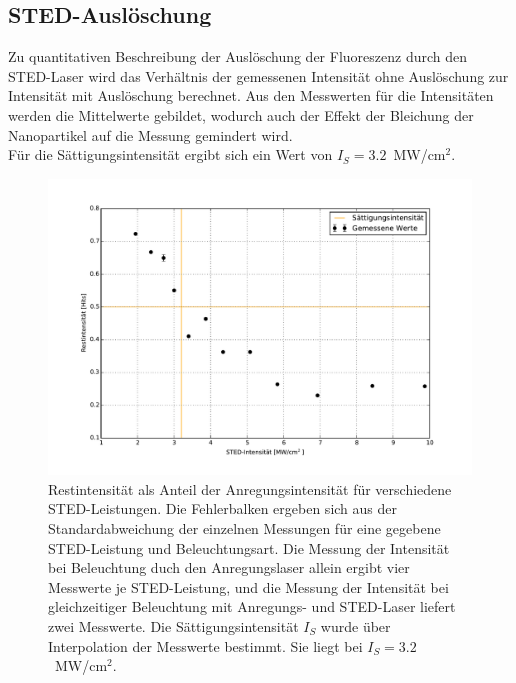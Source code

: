 \subsection{STED-Auslöschung}
Zu quantitativen Beschreibung der Auslöschung der Fluoreszenz durch den STED-Laser wird das Verhältnis der gemessenen Intensität ohne Auslöschung zur Intensität mit Auslöschung berechnet.
Aus den Messwerten für die Intensitäten werden die Mittelwerte gebildet, wodurch auch der Effekt der Bleichung der Nanopartikel auf die Messung gemindert wird.
\\
Für die Sättigungsintensität ergibt sich ein Wert von $I_S = 3.2$~MW/cm$^2$.
\begin{figure}
	\centering
	\includegraphics[width=\textwidth]{plots/depletion.pdf}
	\caption{Restintensität als Anteil der Anregungsintensität für verschiedene STED-Leistungen. 
		Die Fehlerbalken ergeben sich aus der Standardabweichung der einzelnen Messungen für eine gegebene STED-Leistung und Beleuchtungsart. 
		Die Messung der Intensität bei Beleuchtung duch den Anregungslaser allein ergibt vier Messwerte je STED-Leistung, und die Messung der Intensität bei gleichzeitiger Beleuchtung mit Anregungs- und STED-Laser liefert zwei Messwerte.
		Die Sättigungsintensität $I_S$ wurde über Interpolation der Messwerte bestimmt. 
		Sie liegt bei $I_S = 3.2$~MW/cm$^2$.
}\label{fig:depletion}
\end{figure}

